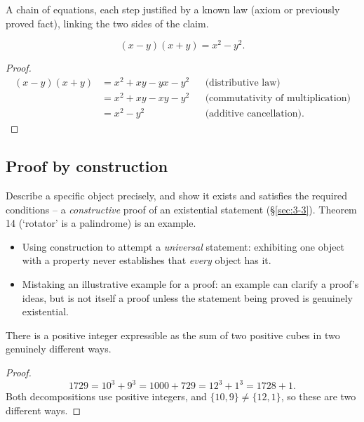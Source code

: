 \documentclass[11pt]{article}
\begin{document}
\begin{note}
A chain of equations, each step justified by a known law (axiom or previously proved fact), linking the two sides of the claim.
\end{note}

\begin{theorem}
\[
(x-y)(x+y) = x^2 - y^2.
\]
\end{theorem}
\begin{proof}
\begin{align*}
(x-y)(x+y) &= x^2 + xy - yx - y^2 && \text{(distributive law)} \\
&= x^2 + xy - xy - y^2 && \text{(commutativity of multiplication)} \\
&= x^2 - y^2 && \text{(additive cancellation)}.
\end{align*}
\end{proof}

\subsection{Proof by construction}
\label{sec:3-7}
\begin{note}[Pattern]
Describe a specific object precisely, and show it exists and satisfies the required conditions -- a \emph{constructive} proof of an existential statement (\S\ref{sec:3-3}). Theorem 14 (`rotator' is a palindrome) is an example.
\end{note}

\begin{note}
\begin{itemize}
    \item Using construction to attempt a \emph{universal} statement: exhibiting one object with a property never establishes that \emph{every} object has it.
    \item Mistaking an illustrative example for a proof: an example can clarify a proof's ideas, but is not itself a proof unless the statement being proved is genuinely existential.
\end{itemize}
\end{note}

\begin{theorem}
There is a positive integer expressible as the sum of two positive cubes in two genuinely different ways.
\end{theorem}
\begin{proof}
\[
1729 = 10^3 + 9^3 = 1000 + 729 = 12^3 + 1^3 = 1728 + 1.
\]
Both decompositions use positive integers, and $\{10,9\} \neq \{12,1\}$, so these are two different ways.
\end{proof}
\end{document}
